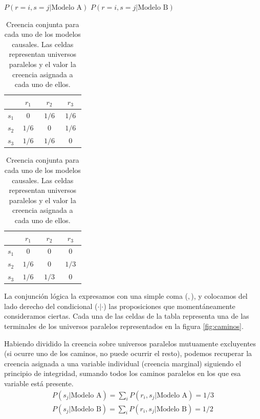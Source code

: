 \documentclass[a4paper,11pt]{book}
\theoremstyle{definition}
\begin{document}
\begin{table}[ht!]
\centering
$P(r=i, s=j | \text{Modelo A})$ \hspace{1.8cm} $P(r=i, s=j | \text{Modelo B})$ \\[0.1cm]
 \begin{tabular}{|c|c|c|c|} \hline \setlength\tabcolsep{0.4cm}
       & \, $r_1$ \, &  \, $r_2$ \, & \, $r_3$ \, \\ \hline
  $s_1$ & $0$ & $1/6$ & $1/6$  \\ \hline
  $s_2$ & $1/6$ & $0$ & $1/6$  \\ \hline
  $s_3$ & $1/6$ & $1/6$ & $0$ \\ \hline
  \end{tabular}
  \hspace{1.5cm}
  \begin{tabular}{|c|c|c|c|} \hline  \setlength\tabcolsep{0.4cm}
 & \, $r_1$ \, &  \, $r_2$ \, & \, $r_3$ \,  \\ \hline
  $s_1$ & $0$ & $0$ & $0$ \\ \hline
  $s_2$ & $1/6$ & $0$ & $1/3$ \\ \hline
  $s_3$ & $1/6$ & $1/3$ & $0$  \\ \hline
  \end{tabular}
  \caption{Creencia conjunta para cada uno de los modelos causales. Las celdas representan universos paralelos y el valor la creencia asignada a cada uno de ellos.}
  \label{tab:creencia_conjunta}
\end{table}
%
La conjunci\'on l\'ogica la expresamos con una simple coma ($,$), y colocamos del lado derecho del condicional ($\cdot|\cdot$) las proposiciones que momentáneamente consideramos ciertas.
%
Cada una de las celdas de la tabla representa una de las terminales de los universos paralelos representados en la figura \ref{fig:caminos}.


Habiendo dividido la creencia sobre universos paralelos mutuamente excluyentes (si ocurre uno de los caminos, no puede ocurrir el resto), podemos recuperar la creencia asignada a una variable individual (creencia marginal) siguiendo el principio de integridad, sumando todos los caminos paralelos en los que esa variable est\'a presente.
%
\begin{equation}
\begin{split}
P(s_j|\text{Modelo A}) = \sum_i P(r_i, s_j|\text{Modelo A}) = 1/3 \\  P(s_j|\text{Modelo B}) = \sum_i P(r_i, s_j|\text{Modelo B}) = 1/2
\end{split}
\end{equation}
\end{document}
